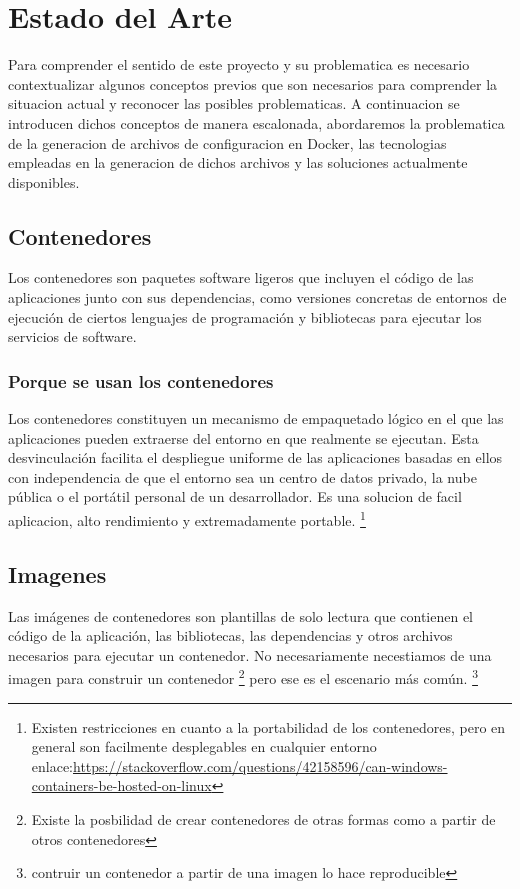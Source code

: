 \documentclass[12pt, a4paper, twoside]{article}
\begin{document}
\section{Estado del Arte}
\label{sec:Estado del Arte}
Para comprender el sentido de este proyecto y su problematica es necesario contextualizar algunos conceptos previos que son necesarios para comprender la situacion actual y reconocer las posibles problematicas.
A continuacion se introducen dichos conceptos de manera escalonada, abordaremos la problematica de la generacion de archivos de configuracion en Docker, las tecnologias empleadas en la generacion de dichos archivos y las soluciones actualmente disponibles.

\subsection{Contenedores}
Los contenedores son paquetes software ligeros que incluyen el código de las aplicaciones junto con sus dependencias, como versiones concretas de entornos de ejecución de ciertos lenguajes de programación y bibliotecas para ejecutar los servicios de software. \cite{googlecontainers}
\subsubsection{Porque se usan los contenedores}
Los contenedores constituyen un mecanismo de empaquetado lógico en el que las aplicaciones pueden extraerse del entorno en que realmente se ejecutan. 
Esta desvinculación facilita el despliegue uniforme de las aplicaciones basadas en ellos con independencia de que el entorno sea un centro de datos privado, la nube pública o el portátil personal de un desarrollador. \cite{googlecontainers}
Es una solucion de facil aplicacion, alto rendimiento y extremadamente portable. \footnote{Existen restricciones en cuanto a la portabilidad de los contenedores, pero en general son facilmente desplegables en cualquier entorno enlace:\href{https://stackoverflow.com/questions/42158596/can-windows-containers-be-hosted-on-linux}{https://stackoverflow.com/questions/42158596/can-windows-containers-be-hosted-on-linux}}
\newpage

\subsection{Imagenes}
Las imágenes de contenedores son plantillas de solo lectura que contienen el código de la aplicación, las bibliotecas, las dependencias y otros archivos necesarios para ejecutar un contenedor. \cite{awsdocker} 
No necesariamente necestiamos de una imagen para construir un contenedor \footnote{Existe la posbilidad de crear contenedores de otras formas como a partir de otros contenedores} pero ese es el escenario más común. \footnote{contruir un contenedor a partir de una imagen lo hace reproducible}
\end{document}
